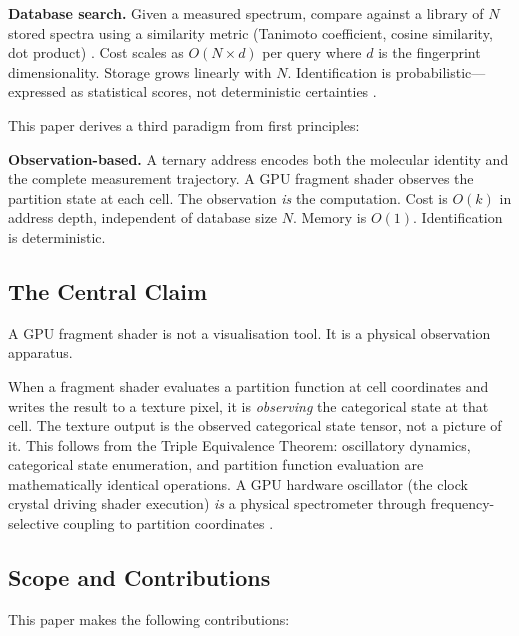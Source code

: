 \documentclass[11pt,twocolumn,a4paper]{article}
\theoremstyle{definition}
\theoremstyle{remark}
\begin{document}
\textbf{Database search.} Given a measured spectrum, compare against a library of $N$ stored spectra using a similarity metric (Tanimoto coefficient, cosine similarity, dot product) \citep{rogers2010, willett1998}. Cost scales as $O(N \times d)$ per query where $d$ is the fingerprint dimensionality. Storage grows linearly with $N$. Identification is probabilistic---expressed as statistical scores, not deterministic certainties \citep{riniker2013, bajusz2015}.

This paper derives a third paradigm from first principles:

\textbf{Observation-based.} A ternary address encodes both the molecular identity and the complete measurement trajectory. A GPU fragment shader observes the partition state at each cell. The observation \emph{is} the computation. Cost is $O(k)$ in address depth, independent of database size $N$. Memory is $O(1)$. Identification is deterministic.

\subsection{The Central Claim}

A GPU fragment shader is not a visualisation tool. It is a physical observation apparatus.

When a fragment shader evaluates a partition function at cell coordinates and writes the result to a texture pixel, it is \emph{observing} the categorical state at that cell. The texture output is the observed categorical state tensor, not a picture of it. This follows from the Triple Equivalence Theorem: oscillatory dynamics, categorical state enumeration, and partition function evaluation are mathematically identical operations. A GPU hardware oscillator (the clock crystal driving shader execution) \emph{is} a physical spectrometer through frequency-selective coupling to partition coordinates \citep{koopman1931}.

\subsection{Scope and Contributions}

This paper makes the following contributions:
\end{document}
